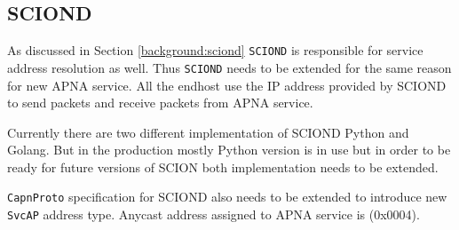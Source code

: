 \subsection{SCIOND}
As discussed in Section \ref{background:sciond} \texttt{SCIOND} is responsible for service address resolution as well. Thus \texttt{SCIOND} needs to be extended for the same reason for new APNA service. All the endhost use the IP address provided by SCIOND to send packets and receive packets from APNA service.

Currently there are two different implementation of SCIOND Python and Golang. But in the production mostly Python version is in use but in order to be ready for future versions of SCION both implementation needs to be extended.

\texttt{CapnProto} specification for SCIOND also needs to be extended to introduce new \texttt{SvcAP} address type. Anycast address assigned to APNA service is (0x0004). 


